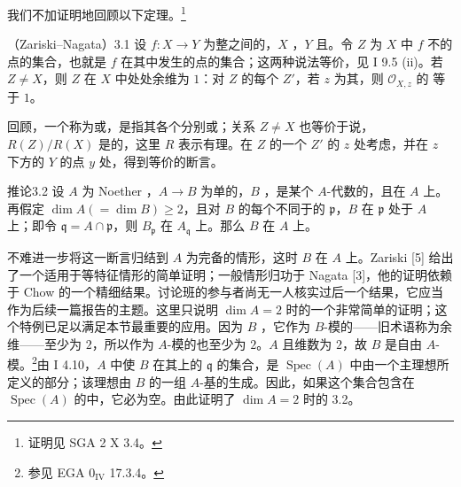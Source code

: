 我们不加证明地回顾以下定理。\footnote{证明见 SGA 2 X 3.4。}
\begin{SGAresult}{（Zariski–Nagata）}{3.1}
设 $f:X\to Y$ 为整之间的，$X$ ，$Y$ 且。令 $Z$ 为 $X$ 中 $f$ 不的点的集合，也就是 $f$ 在其中发生的点的集合；这两种说法等价，见 I 9.5 (ii)。若 $Z\ne X$，则 $Z$ 在 $X$ 中处处余维为 $1$：对 $Z$ 的每个 $Z'$，若 $z$ 为其，则 $\mathcal O_{X,z}$ 的 等于 $1$。
\end{SGAresult}
回顾，一个称为或，是指其各个分别或；关系 $Z\ne X$ 也等价于说， $R(Z)/R(X)$ 是的，这里 $R$ 表示有理。在 $Z$ 的一个 $Z'$ 的 $z$ 处考虑，并在 $z$ 下方的 $Y$ 的点 $y$ 处，得到等价的断言。
\begin{SGAresult}{推论}{3.2}
设 $A$ 为 Noether ，$A\to B$ 为单的，$B$ ，是某个 $A$-代数的，且在 $A$ 上。再假定 $\dim A(=\dim B)\geq2$，且对 $B$ 的每个不同于的 $\mathfrak p$，$B$ 在 $\mathfrak p$ 处于 $A$ 上；即令 $\mathfrak q=A\cap\mathfrak p$，则 $B_{\mathfrak p}$ 在 $A_{\mathfrak q}$ 上。那么 $B$ 在 $A$ 上。
\end{SGAresult}
不难进一步将这一断言归结到 $A$ 为完备的情形，这时 $B$ 在 $A$ 上。Zariski [5] 给出了一个适用于等特征情形的简单证明；一般情形归功于 Nagata [3]，他的证明依赖于 Chow 的一个精细结果。讨论班的参与者尚无一人核实过后一个结果，它应当作为后续一篇报告的主题。这里只说明 $\dim A=2$ 时的一个非常简单的证明；这个特例已足以满足本节最重要的应用。因为 $B$ ，它作为 $B$-模的——旧术语称为余维——至少为 $2$，所以作为 $A$-模的也至少为 $2$。$A$ 且维数为 $2$，故 $B$ 是自由 $A$-模。\footnote{参见 EGA $0_{\mathrm{IV}}$ 17.3.4。}由 I 4.10，$A$ 中使 $B$ 在其上的 $\mathfrak q$ 的集合，是 $\operatorname{Spec}(A)$ 中由一个主理想所定义的部分；该理想由 $B$ 的一组 $A$-基的生成。因此，如果这个集合包含在 $\operatorname{Spec}(A)$ 的中，它必为空。由此证明了 $\dim A=2$ 时的 3.2。

